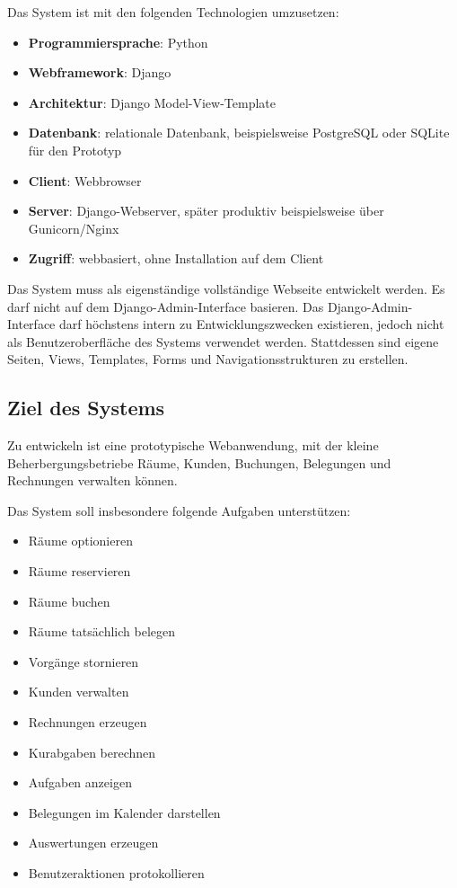 Das System ist mit den folgenden Technologien umzusetzen:

\begin{itemize}
\item \textbf{Programmiersprache}: Python
\item \textbf{Webframework}: Django
\item \textbf{Architektur}: Django Model-View-Template
\item \textbf{Datenbank}: relationale Datenbank, beispielsweise PostgreSQL oder SQLite für den Prototyp
\item \textbf{Client}: Webbrowser
\item \textbf{Server}: Django-Webserver, später produktiv beispielsweise über Gunicorn/Nginx
\item \textbf{Zugriff}: webbasiert, ohne Installation auf dem Client
\end{itemize}

Das System muss als eigenständige vollständige Webseite entwickelt werden. Es darf nicht auf dem Django-Admin-Interface basieren. Das Django-Admin-Interface darf höchstens intern zu Entwicklungszwecken existieren, jedoch nicht als Benutzeroberfläche des Systems verwendet werden. Stattdessen sind eigene Seiten, Views, Templates, Forms und Navigationsstrukturen zu erstellen.

\subsection{Ziel des Systems}

Zu entwickeln ist eine prototypische Webanwendung, mit der kleine Beherbergungsbetriebe Räume, Kunden, Buchungen, Belegungen und Rechnungen verwalten können.

Das System soll insbesondere folgende Aufgaben unterstützen:

\begin{itemize}
\item Räume optionieren
\item Räume reservieren
\item Räume buchen
\item Räume tatsächlich belegen
\item Vorgänge stornieren
\item Kunden verwalten
\item Rechnungen erzeugen
\item Kurabgaben berechnen
\item Aufgaben anzeigen
\item Belegungen im Kalender darstellen
\item Auswertungen erzeugen
\item Benutzeraktionen protokollieren
\end{itemize}

